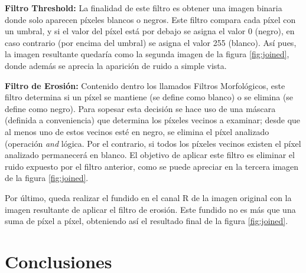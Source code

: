 \documentclass[twocolumn,twoside]{Jornadas}
\begin{document}
\vspace{5 mm}

\textbf{Filtro Threshold:} La finalidad de este filtro es obtener una imagen binaria donde solo aparecen píxeles blancos o negros. Este filtro compara cada píxel con un umbral, y si el valor del píxel está por debajo se asigna el valor 0 (negro), en caso contrario (por encima del umbral) se asigna el valor 255 (blanco). Así pues, la imagen resultante quedaría como la segunda imagen de la figura \ref{fig:joined}, donde además se aprecia la aparición de ruido a simple vista.

\vspace{5 mm}

\textbf{Filtro de Erosión:} Contenido dentro los llamados Filtros Morfológicos, este filtro determina si un píxel se mantiene (se define como blanco) o se elimina (se define como negro). Para sopesar esta decisión se hace uso de una máscara (definida a conveniencia) que determina los píxeles vecinos a examinar; desde que al menos uno de estos vecinos esté en negro, se elimina el píxel analizado (operación \emph{and} lógica. Por el contrario, si todos los píxeles vecinos existen el píxel analizado permanecerá en blanco. El objetivo de aplicar este filtro es eliminar el ruido expuesto por el filtro anterior, como se puede apreciar en la tercera imagen de la figura \ref{fig:joined}.

\vspace{5 mm}

Por último, queda realizar el fundido en el canal R de la imagen original con la imagen resultante de aplicar el filtro de erosión. Este fundido no es más que una suma de píxel a píxel, obteniendo así el resultado final de la figura \ref{fig:joined}.

\section{Conclusiones}
\end{document}
